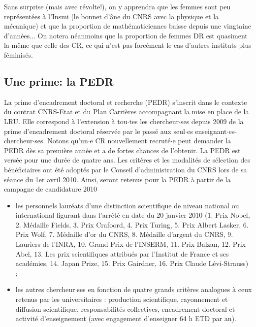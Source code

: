 Sans surprise (mais avec r\'evolte!), on y apprendra que les femmes sont peu repr\'esent\'ees
\`a l'Insmi (le bonnet d'\^ane du CNRS avec la physique et la m\'ecanique) et que la proportion de math\'ematiciennes
baisse depuis une vingtaine d'ann\'ees... On notera n\'eanmoins que la proportion de femmes DR est quasiment la m\^eme que celle des CR, ce qui n'est pas forc\'ement le cas d'autres instituts plus f\'eminis\'es. 


\subsection{Une prime: la PEDR}
\label{PEDR CNRS}

La prime d'encadrement doctoral et recherche (PEDR) s'inscrit dans le contexte du contrat CNRS-Etat et du Plan Carri\`eres
accompagnant la mise en place de la LRU. Elle correspond \`a l'extension \`a tou$\cdot$tes les chercheur$\cdot$ses depuis 2009
de la prime d'encadrement doctoral r\'eserv\'ee par le pass\'e aux seul$\cdot$es enseignant$\cdot$es-chercheur$\cdot$ses. Notons qu'un$\cdot$e CR nouvellement recrut\'e$\cdot$e peut demander la PEDR d\`es sa premi\`ere ann\'ee et a de fortes chances de l'obtenir.
 La PEDR est vers\'ee pour une dur\'ee de quatre ans.
Les crit\`eres et les modalit\'es de s\'election des b\'en\'eficiaires ont \'et\'e adopt\'es par le Conseil d'administration
du CNRS lors de sa s\'eance du 1er avril 2010.
Ainsi, seront retenus pour la PEDR \`a partir de la campagne de candidature 2010
\begin{itemize}
\item les personnels laur\'eats d'une distinction scientifique de niveau national ou international figurant
dans l'arr\^et\'e en date du 20 janvier 2010 (1. Prix Nobel, 2. M\'edaille Fields, 3. Prix Crafoord, 4. Prix Turing,
5. Prix Albert Lasker, 6. Prix Wolf, 7. M\'edaille d'or du CNRS, 8. M\'edaille d'argent du CNRS,
9. Lauriers de l'INRA, 10. Grand Prix de l'INSERM, 11. Prix Balzan, 12. Prix Abel, 13. Les prix scientifiques
attribu\'es par l'Institut de France et ses acad\'emies, 14. Japan Prize, 15. Prix Gairdner, 16. Prix Claude L\'evi-Strauss) ;
\item les autres chercheur$\cdot$ses en fonction de quatre grands crit\`eres analogues \`a ceux retenus
 par les universitaires : production scientifique, rayonnement et diffusion scientifique, responsabilit\'es
collectives, encadrement doctoral et activit\'e d'enseignement (avec engagement d'enseigner 64 h ETD par an).
\end{itemize}


